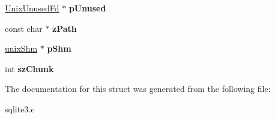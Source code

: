 \begin{DoxyCompactItemize}
\item 
\hyperlink{structUnixUnusedFd}{Unix\+Unused\+Fd} $\ast$ {\bfseries p\+Unused}\hypertarget{structunixFile_a3820ccead5805d2ea61ca1c752646852}{}\label{structunixFile_a3820ccead5805d2ea61ca1c752646852}

\item 
const char $\ast$ {\bfseries z\+Path}\hypertarget{structunixFile_afc5eff0948d553308cf90a79d4a06f17}{}\label{structunixFile_afc5eff0948d553308cf90a79d4a06f17}

\item 
\hyperlink{structunixShm}{unix\+Shm} $\ast$ {\bfseries p\+Shm}\hypertarget{structunixFile_a53c653bd73cdc6f518ecffe95062e91a}{}\label{structunixFile_a53c653bd73cdc6f518ecffe95062e91a}

\item 
int {\bfseries sz\+Chunk}\hypertarget{structunixFile_a5f6307d3446ce1b149df756c00c3bd2e}{}\label{structunixFile_a5f6307d3446ce1b149df756c00c3bd2e}

\end{DoxyCompactItemize}


The documentation for this struct was generated from the following file\+:\begin{DoxyCompactItemize}
\item 
sqlite3.\+c\end{DoxyCompactItemize}
